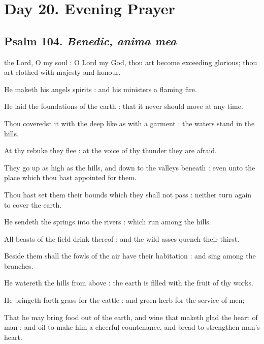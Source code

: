 \clearpage
\section*{Day 20. Evening Prayer}

\subsection{Psalm 104. \textit{Benedic, anima mea}}

 the Lord, O my soul : O Lord my God, thou art become exceeding glorious; thou art clothed with majesty and honour.\par
{}
He maketh his angels spirits : and his ministers a flaming fire.\par
{}He laid the foundations of the earth : that it never should move at any time.\par
{}Thou coveredst it with the deep like as with a garment : the waters stand in the hills.\par
{}At thy rebuke they flee : at the voice of thy thunder they are afraid.\par
{}They go up as high as the hills, and down to the valleys beneath : even unto the place which thou hast appointed for them.\par
{}Thou hast set them their bounds which they shall not pass : neither turn again to cover the earth.\par
{}He sendeth the springs into the rivers : which run among the hills.\par
{}All beasts of the field drink thereof : and the wild asses quench their thirst.\par
{}Beside them shall the fowls of the air have their habitation : and sing among the branches.\par
{}He watereth the hills from above : the earth is filled with the fruit of thy works.\par
{}He bringeth forth grass for the cattle : and green herb for the service of men;\par
{}That he may bring food out of the earth, and wine that maketh glad the heart of man : and oil to make him a cheerful countenance, and bread to strengthen man's heart.\par
